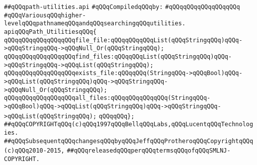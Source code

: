 \label{src/lib/src/path-utilities.api}
\verb|##qQQqpath-utilities.api|\newline
\newline
\verb|#qQQqCompiledqQQqby:|\newline
\verb|#qQQqqQQqqQQqqQQqqQQq|\newline
\newline
\newline
\newline
\verb|#qQQqVariousqQQqhigher-levelqQQqpathnameqQQqandqQQqsearchingqQQqutilities.|\newline
\newline
\newline
\verb|apiqQQqPath_UtilitiesqQQq{|\newline
\newline
\verb|qQQqqQQqqQQqqQQqqQQqfile_file:qQQqqQQqqQQqList(qQQqStringqQQq)qQQq->qQQqStringqQQq->qQQqNull_Or(qQQqStringqQQq);|\newline
\verb|qQQqqQQqqQQqqQQqqQQqfind_files:qQQqqQQqList(qQQqStringqQQq)qQQq->qQQqStringqQQq->qQQqList(qQQqStringqQQq);|\newline
\newline
\verb|qQQqqQQqqQQqqQQqqQQqexists_file:qQQqqQQq(StringqQQq->qQQqBool)qQQq->qQQqList(qQQqStringqQQq)qQQq->qQQqStringqQQq->qQQqNull_Or(qQQqStringqQQq);|\newline
\verb|qQQqqQQqqQQqqQQqqQQqall_files:qQQqqQQqqQQqqQQq(StringqQQq->qQQqBool)qQQq->qQQqList(qQQqStringqQQq)qQQq->qQQqStringqQQq->qQQqList(qQQqStringqQQq);|\newline
\newline
\verb|qQQqqQQq};|\newline
\newline
\newline
\newline
\verb|##qQQqCOPYRIGHTqQQq(c)qQQq1997qQQqBellqQQqLabs,qQQqLucentqQQqTechnologies.|\newline
\verb|##qQQqSubsequentqQQqchangesqQQqbyqQQqJeffqQQqProtheroqQQqCopyrightqQQq(c)qQQq2010-2015,|\newline
\verb|##qQQqreleasedqQQqperqQQqtermsqQQqofqQQqSMLNJ-COPYRIGHT.|\newline

